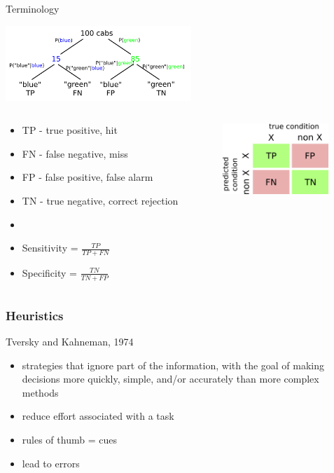 \documentclass[]{beamer}
\begin{document}
\begin{frame}{Terminology}
 \begin{overlayarea}{110mm}{80mm}
\centering
  \includegraphics[width=70mm]{figs/l11/taxi_cab_7.png}
\begin{columns}[T]
\begin{column}{70mm}
\begin{itemize}
 \item TP - true positive, hit
 \item FN - false negative, miss
 \item FP - false positive, false alarm
 \item TN - true negative, correct rejection
 \item[]
 \item Sensitivity = $\frac{TP}{TP+FN}$
 \item Specificity = $\frac{TN}{TN+FP}$ 
\end{itemize}
\end{column}
\begin{column}{40mm}
  \includegraphics[width=40mm]{figs/l11/contingency.png} 
\end{column}
 \end{columns}

 \end{overlayarea}
\end{frame}


\begin{frame}
 \frametitle{Heuristics}
\begin{overlayarea}{110mm}{80mm}
Tversky and Kahneman, 1974
 \begin{itemize}
 \item strategies that ignore part of the information, with the goal of making decisions more quickly, simple, and/or accurately than more complex methods 
 \item reduce effort associated with a task
 \item rules of thumb = cues
 \item lead to errors
 \end{itemize}
\end{overlayarea}
\end{frame}
\end{document}
